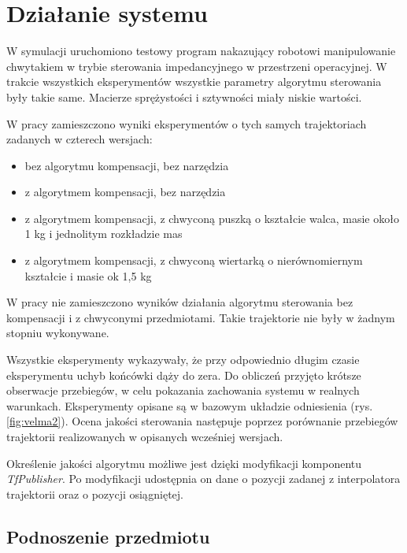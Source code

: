 
\chapter{Działanie systemu\label{chap:weryfikacja_systemu}}
\graphicspath{{../../velma/przerobione_testy/out/}{./images}}

W symulacji uruchomiono testowy program  nakazujący robotowi manipulowanie chwytakiem w trybie sterowania impedancyjnego w przestrzeni operacyjnej.  W trakcie wszystkich eksperymentów wszystkie parametry algorytmu sterowania były takie same. Macierze sprężystości i sztywności miały niskie wartości. 


W pracy zamieszczono wyniki eksperymentów o tych samych trajektoriach zadanych w czterech wersjach:
\begin{itemize}
	\item bez algorytmu kompensacji, bez narzędzia
	\item z algorytmem kompensacji, bez narzędzia
	\item z algorytmem kompensacji, z chwyconą puszką o kształcie walca, masie około 1 kg i jednolitym rozkładzie mas
	\item z algorytmem kompensacji, z chwyconą wiertarką o nierównomiernym kształcie i masie ok 1,5 kg
\end{itemize}
 W pracy nie zamieszczono wyników działania algorytmu sterowania bez kompensacji i z chwyconymi przedmiotami. Takie trajektorie nie były  w żadnym stopniu wykonywane. 
 
Wszystkie eksperymenty wykazywały, że przy odpowiednio długim czasie eksperymentu uchyb końcówki dąży do zera. Do obliczeń przyjęto krótsze obserwacje przebiegów, w celu pokazania zachowania systemu w realnych warunkach.  Eksperymenty opisane są w bazowym układzie odniesienia (rys. \ref{fig:velma2}).  Ocena jakości sterowania następuje poprzez porównanie przebiegów trajektorii realizowanych w opisanych wcześniej wersjach.

Określenie jakości algorytmu możliwe jest dzięki modyfikacji komponentu \textit{TfPublisher}. Po modyfikacji udostępnia on dane o pozycji zadanej z interpolatora trajektorii oraz o pozycji osiągniętej. 


\section{Podnoszenie przedmiotu}

